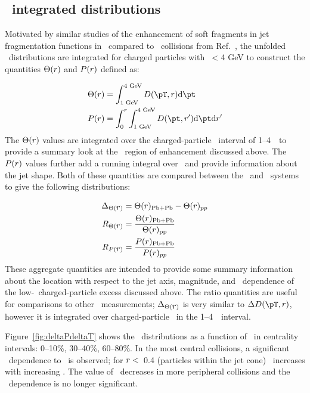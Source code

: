 \subsection{\pt\ integrated distributions}
\label{sec:discussion_int}
Motivated by similar studies of the enhancement of soft fragments in 
jet fragmentation functions in \pbpb\ compared to \pp\ collisions from Ref.~\cite{Aaboud:2018hpb}, the unfolded \Dptr\ distributions are integrated for charged particles with \pt\ < 4 GeV to construct the quantities $\Theta(\mbox{$r$})$ and $P(\mbox{$r$})$ defined as:

\begin{align*}
\Theta(\rvar) &= \int_{1 \text{ GeV}}^{4 \text{ GeV}} \Dptr  \fd \pt \\
P(\rvar) &= \int_0^r \int_{1 \text{ GeV}}^{4 \text{ GeV}} D(\pt, r') \fd \pt \fd r'
\end{align*}
The $\Theta(\mbox{$r$})$ values are integrated over the charged-particle \pt\ interval of 1--4~\GeV\ to provide a summary look at the \pt\ region of enhancement discussed above.
The $P(\mbox{$r$})$ values further add a running integral over \rvar\ and provide information about the jet shape.
Both of these quantities are compared between the \pp\ and \pbpb\ systems to give the following distributions:

\begin{align*}
\Delta_{\Theta(\mbox{$r$})} &= \Theta(\mbox{$r$})_{\mathrm{Pb+Pb}} - \Theta(\mbox{$r$})_{pp} \\
R_{\Theta(\mbox{$r$})} &= \frac{\Theta(\mbox{$r$})_{\mathrm{Pb+Pb}}}{\Theta(\mbox{$r$})_{\mathrm{pp}}} \\
R_{P(\mbox{$r$})} &= \frac{P(\mbox{$r$})_{\mathrm{Pb+Pb}}}{P(\mbox{$r$})_{pp}}
\end{align*}
These aggregate quantities are intended to provide some summary information about the location with respect to the jet axis, magnitude, and \ptjet\ dependence of the low-\pt\ charged-particle excess discussed above.
The ratio quantities are useful for comparisons to other \pbpb\ measurements; $\Delta_{\Theta(\mbox{$r$})}$ is very similar to $\DeltaDptr$, however it is integrated over charged-particle \pt\ in the 1--4~\GeV\ interval.

Figure~\ref{fig:deltaPdeltaT} shows the \DeltaTheta\ distributions as a function of \rvar\ in centrality intervals: 0--10\%, 30--40\%, 60--80\%.
In the most central collisions, a significant \ptjet\ dependence to \DeltaTheta\ is observed; for $\mbox{$r$} <$~0.4 (particles within the jet cone) \DeltaTheta\ increases with increasing \ptjet.
The value of \DeltaTheta\ decreases in more peripheral collisions and the \ptjet\ dependence is no longer significant.

